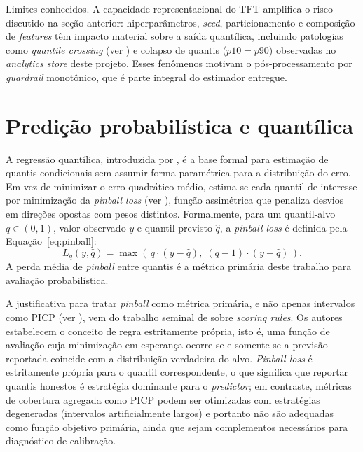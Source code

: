 Limites conhecidos. A capacidade representacional do TFT amplifica o risco discutido na seção anterior: hiperparâmetros, \textit{seed}, particionamento e composição de \textit{features} têm impacto material sobre a saída quantílica, incluindo patologias como \textit{quantile crossing} (ver ) e colapso de quantis ($p10 = p90$) observadas no \textit{analytics store} deste projeto. Esses fenômenos motivam o pós-processamento por \textit{guardrail} monotônico, que é parte integral do estimador entregue.

\section{Predição probabilística e quantílica}
A regressão quantílica, introduzida por \cite{KOENKERBASSETT1978}, é a base formal para estimação de quantis condicionais sem assumir forma paramétrica para a distribuição do erro. Em vez de minimizar o erro quadrático médio, estima-se cada quantil de interesse por minimização da \textit{pinball loss} (ver ), função assimétrica que penaliza desvios em direções opostas com pesos distintos. Formalmente, para um quantil-alvo $q \in (0,1)$, valor observado $y$ e quantil previsto $\hat{q}$, a \textit{pinball loss} é definida pela Equação~\ref{eq:pinball}:
\begin{equation}
    L_q(y, \hat{q}) = \max\left(\,q \cdot (y - \hat{q}),\; (q - 1) \cdot (y - \hat{q})\,\right).
    \label{eq:pinball}
\end{equation}
A perda média de \textit{pinball} entre quantis é a métrica primária deste trabalho para avaliação probabilística.

A justificativa para tratar \textit{pinball} como métrica primária, e não apenas intervalos como PICP (ver ), vem do trabalho seminal de \cite{GNEITING2007} sobre \textit{scoring rules}. Os autores estabelecem o conceito de regra estritamente própria, isto é, uma função de avaliação cuja minimização em esperança ocorre se e somente se a previsão reportada coincide com a distribuição verdadeira do alvo. \textit{Pinball loss} é estritamente própria para o quantil correspondente, o que significa que reportar quantis honestos é estratégia dominante para o \textit{predictor}; em contraste, métricas de cobertura agregada como PICP podem ser otimizadas com estratégias degeneradas (intervalos artificialmente largos) e portanto não são adequadas como função objetivo primária, ainda que sejam complementos necessários para diagnóstico de calibração.

